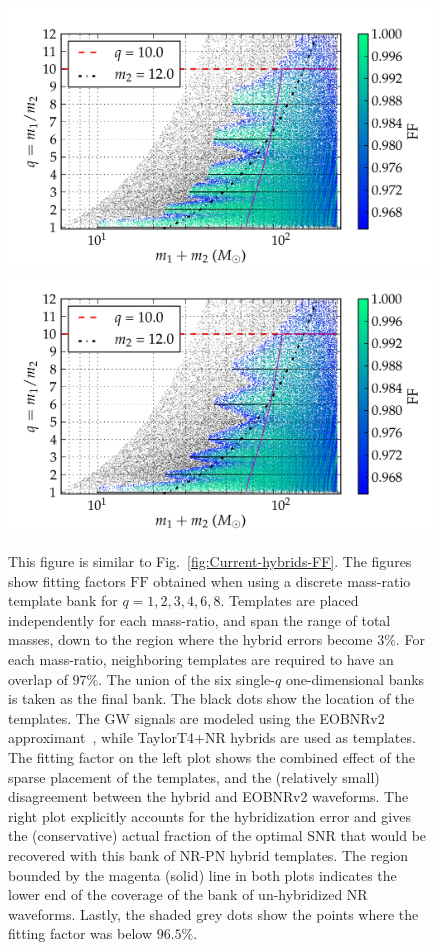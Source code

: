 \documentclass[aps,
prd,
twocolumn,
superscriptaddress,
lengthcheck,showpacs,letterpaper,nofootinbib,
floatfix]{revtex4-1}
\newcommand{\FF}{\mathrm{FF}}
\begin{document}
\begin{figure}
\begin{center}
\includegraphics[width=\columnwidth]{bank_26022013_02_hybrids_mtot200_logMq_NOhybMM-tiny.png}
\includegraphics[width=\columnwidth]{bank_26022013_02_hybrids_mtot200_logMq_hybMM-tiny.png}
\caption{\label{fig:Current-real-hybrids-FF}This figure is similar to 
  Fig.~\ref{fig:Current-hybrids-FF}. The figures show fitting
  factors $\FF$ obtained when using a discrete mass-ratio template bank for
  $q=1,2,3,4,6,8$. Templates are placed independently for each mass-ratio, and 
  span the range of total masses, down to the region where the hybrid errors
  become $3\%$. For each mass-ratio, neighboring templates are 
  required to have an overlap of $97\%$. The union of the six single-$q$ 
  one-dimensional banks is taken as the final bank. The black dots show the 
  location of the templates. The GW signals are modeled using the EOBNRv2
  approximant~\cite{BuonannoEOBv2Main}, while TaylorT4+NR hybrids are used as
  templates. The fitting factor on the left plot shows the combined effect of 
  the sparse placement of the templates, and the (relatively small) 
  disagreement between the hybrid and EOBNRv2 waveforms. The right plot
  explicitly accounts for the hybridization error and gives the (conservative)
  actual fraction of the optimal SNR that would be recovered
  with this bank of NR-PN hybrid templates. The region bounded by the magenta 
  (solid) line in both plots indicates the lower end of the coverage of the 
  bank of un-hybridized NR waveforms. Lastly, the shaded grey dots show the 
  points where the fitting factor was below $96.5\%$.  }
\end{center}
\end{figure}
\end{document}
